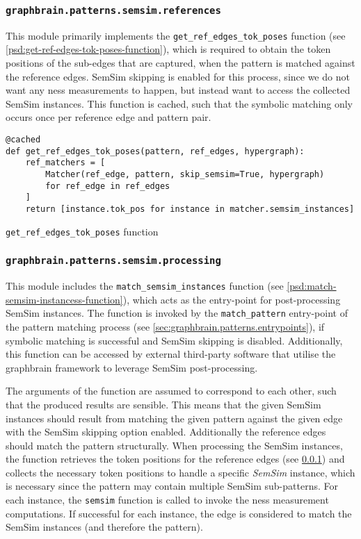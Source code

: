 \documentclass[11pt, numbers=noenddot]{scrreprt}
\begin{document}
\subsubsection{\texttt{graphbrain.patterns.semsim.references}}
\label{sec:graphbrain.patterns.semsim.references}
This module primarily implements the \texttt{get\_ref\_edges\_tok\_poses} function (see \cref{psd:get-ref-edges-tok-poses-function}), which is required to obtain the token positions of the sub-edges that are captured, when the pattern is matched against the reference edges. SemSim skipping is enabled for this process, since we do not want any \gls{ness} measurements to happen, but instead  want to access the collected SemSim instances.  This function is cached, such that the symbolic matching only occurs once per reference edge and pattern pair.


\begin{pseudo}
\begin{lstlisting}
@cached
def get_ref_edges_tok_poses(pattern, ref_edges, hypergraph):
    ref_matchers = [
        Matcher(ref_edge, pattern, skip_semsim=True, hypergraph)
        for ref_edge in ref_edges
    ]
    return [instance.tok_pos for instance in matcher.semsim_instances]
\end{lstlisting}
\caption{\texttt{get\_ref\_edges\_tok\_poses} function}
\label{psd:get-ref-edges-tok-poses-function}
\end{pseudo}

\subsubsection{\texttt{graphbrain.patterns.semsim.processing}}
\label{sec:graphbrain.patterns.semsim.processing}
This module includes the \texttt{match\_semsim\_instances} function (see \cref{psd:match-semsim-instancess-function}), which acts as the entry-point for post-processing SemSim instances. The function is invoked by the \texttt{match\_pattern} entry-point of the pattern matching process (see  \cref{sec:graphbrain.patterns.entrypoints}), if symbolic matching is successful and SemSim skipping is disabled. Additionally, this function can be accessed by external third-party software that utilise the graphbrain framework to leverage SemSim post-processing.

The arguments of the function are assumed to correspond to each other, such that the produced results are sensible. This means that the given SemSim instances should result from matching the given pattern against the given edge with the SemSim skipping option enabled. Additionally the reference edges should match the pattern structurally. When processing the SemSim instances, the function retrieves the token positions for the reference edges (see \cref{sec:graphbrain.patterns.semsim.references}) and collects the necessary token positions to handle a specific \textit{SemSim} instance, which is necessary since the pattern may contain multiple SemSim  sub-patterns. For each instance, the \texttt{semsim} function is called to invoke the \gls{ness} measurement computations. If successful for each instance, the edge is considered to match the SemSim instances (and therefore the pattern).
 
\end{document}
